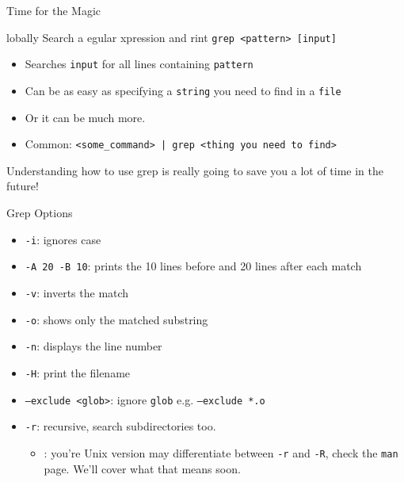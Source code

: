 \begin{frame}[fragile]{Time for the Magic}
  \begin{block}{lobally Search a egular xpression and rint}
    \texttt{grep <pattern> [input]}
    \begin{itemize}
      \item Searches \texttt{input} for all lines containing \texttt{pattern}
      \item Can be as easy as specifying a \texttt{string} you need to find in a \texttt{file}
      \item Or it can be much more.
      \item Common: \texttt{<some\_command> | grep <thing you need to find>}
    \end{itemize}
  \end{block}\wl

  Understanding how to use grep is really going to save you a lot of time in the future!
\end{frame}

\begin{frame}[fragile]{Grep Options}
  \begin{itemize}
    \item \texttt{-i}: ignores case
    \item \texttt{-A 20 -B 10}: prints the 10 lines before and 20 lines after each match
    \item \texttt{-v}: inverts the match
    \item \texttt{-o}: shows only the matched substring
    \item \texttt{-n}: displays the line number
    \item \texttt{-H}: print the filename
    \item \texttt{--exclude <glob>}: ignore \texttt{glob} e.g. \texttt{--exclude *.o}
    \item \texttt{-r}: recursive, search subdirectories too.
    \begin{itemize}
      \item {}: you're Unix version may differentiate between \texttt{-r} and \texttt{-R}, check the
            \texttt{man} page.  We'll cover what that means soon.
    \end{itemize}
  \end{itemize}
\end{frame}

